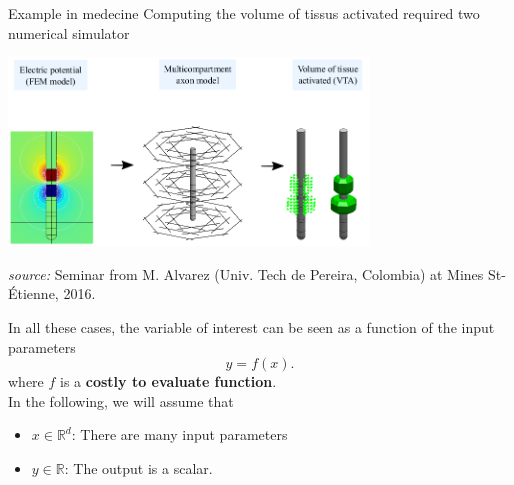 \documentclass{beamer}
\begin{document}
\begin{frame}{}
\begin{exampleblock}{Example in medecine}
Computing the volume of tissus activated required two numerical simulator
\begin{center}
\includegraphics[height=5cm]{figures/DBSmodels.png}
\end{center}
\begin{flushright}
{\small \emph{source:} Seminar from M. Alvarez (Univ. Tech de Pereira, Colombia) at Mines St-\'Etienne, 2016.}
\end{flushright}
\end{exampleblock}
\end{frame}

\begin{frame}{}
In all these cases, the variable of interest can be seen as a function of the input parameters
$$ y = f(x). $$
where $f$ is a \textbf{costly to evaluate function}. \\
\vspace{5mm}
In the following, we will assume that 
\begin{itemize}
	\item $x \in \mathds{R}^d$: There are many input parameters
	\item $y \in \mathds{R}$: The output is a scalar.
\end{itemize}
\end{frame}
\end{document}
